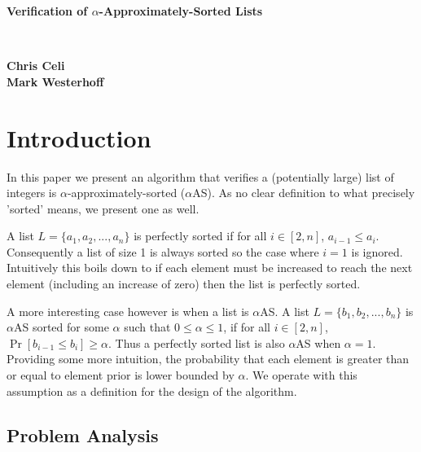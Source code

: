 \documentclass[11pt]{article}
\begin{document}
\begin{titlepage}
	\begin{center}
		\vspace*{1in}	
		\Huge
		\textbf{Verification of $\alpha$-Approximately-Sorted Lists}
		\vspace{.5in}
		
		\Large
		 \\
		
		\vspace{1.5in}
		
		\textbf{Chris Celi \\ Mark Westerhoff}
	\end{center}
\end{titlepage}

\clearpage

\tableofcontents

\clearpage

\section{Introduction}

In this paper we present an algorithm that verifies a (potentially large) list of integers is $\alpha$-approximately-sorted ($\alpha$AS). As no clear definition to what precisely 'sorted' means, we present one as well. 

A list $L = \{a_1, a_2, ..., a_n\}$ is perfectly sorted if for all $i \in [2, n]$, $a_{i-1} \leq a_i$. Consequently a list of size 1 is always sorted so the case where $i = 1$ is ignored. Intuitively this boils down to if each element must be increased to reach the next element (including an increase of zero) then the list is perfectly sorted. 

A more interesting case however is when a list is $\alpha$AS. A list $L = \{b_1, b_2, ..., b_n\}$ is $\alpha$AS sorted for some $\alpha$ such that $0 \leq \alpha \leq 1$, if for all $i \in [2, n]$, $\Pr[b_{i-1} \leq b_i] \geq \alpha$. Thus a perfectly sorted list is also $\alpha$AS when $\alpha = 1$. Providing some more intuition, the probability that each element is greater than or equal to element prior is lower bounded by $\alpha$. We operate with this assumption as a definition for the design of the algorithm. 

\subsection{Problem Analysis}
\end{document}
